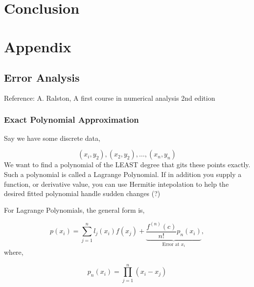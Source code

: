 



\section{Conclusion}
\section{Appendix}

\subsection{Error Analysis}


Reference: A. Ralston, A first course in numerical analysis 2nd edition

\subsubsection{Exact Polynomial Approximation}


Say we have some discrete data,

\begin{equation*}
    \left( x_{i},y_2 \right),\left( x_2, y_2 \right), \dots , \left( x_n,y_n \right)
\end{equation*}
We want to find a polynomial of the LEAST degree that gits these points exactly. 
Such a polynomial is called a Lagrange Polynomial. If in addition you supply a
function, or derivative value, you can use Hermitie intepolation to help the 
desired fitted polynomial handle sudden changes (?)

For Lagrange Polynomials, the general form is,

\begin{equation*}
    p\left( x_i  \right) =
    \sum_{j=1}^{n} l_j(x_i) f(x_j) + \underbrace{\frac{f^{(n)}\left( c \right)}
    {n!}p_n(x_i)}_{\text{Error at } x_i},
\end{equation*}
where,

\begin{equation*}
    p_n(x_i) = \prod_{j = 1}^{n} \left( x_i - x_j \right) 
\end{equation*}

